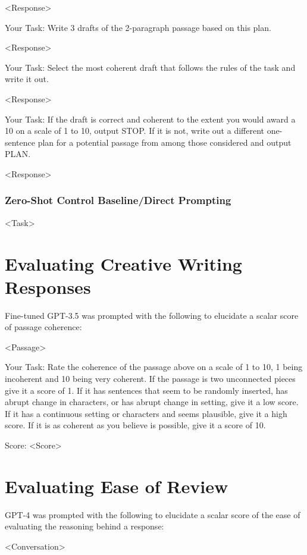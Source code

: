 \documentclass[11pt]{article}
\begin{document}
<Response>

Your Task: Write 3 drafts of the 2-paragraph passage based on this plan.

<Response>

Your Task: Select the most coherent draft that follows the rules of the task and write it out.

<Response>

Your Task: If the draft is correct and coherent to the extent you would award a 10 on a scale of 1 to 10, output STOP. If it is not, write out a different one-sentence plan for a potential passage from among those considered and output PLAN.

<Response>

\subsubsection*{Zero-Shot Control Baseline/Direct Prompting}

<Task>

\section{Evaluating Creative Writing Responses}
\label{sec:evaluating_creative_writing}

Fine-tuned GPT-3.5 was prompted with the following to elucidate a scalar score of passage coherence:

<Passage>

Your Task: Rate the coherence of the passage above on a scale of 1 to 10, 1 being incoherent and 10 being very coherent. If the passage is two unconnected pieces give it a score of 1. If it has sentences that seem to be randomly inserted, has abrupt change in characters, or has abrupt change in setting, give it a low score. If it has a continuous setting or characters and seems plausible, give it a high score. If it is as coherent as you believe is possible, give it a score of 10.

Score: <Score>

\section{Evaluating Ease of Review}
\label{sec:evaluating_ease_of_review}

GPT-4 was prompted with the following to elucidate a scalar score of the ease of evaluating the reasoning behind a response:

<Conversation>
\end{document}
